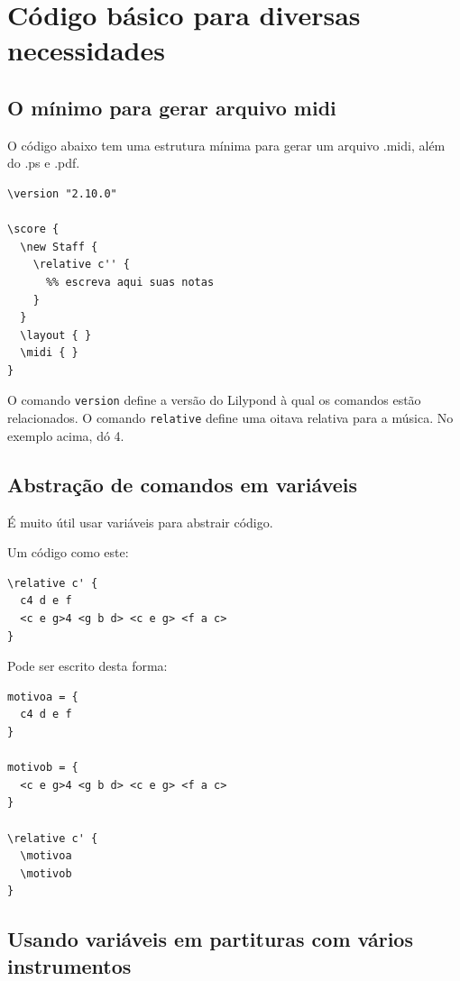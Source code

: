 \documentclass[12pt,brazil]{book}
\begin{document}
\section{Código básico para diversas necessidades}
\label{sec:codigo-basico-para}

\subsection{O mínimo para gerar arquivo midi}
\label{sec:o-minimo-para}

O código abaixo tem uma estrutura mínima para gerar um arquivo .midi,
além do .ps e .pdf.

\begin{verbatim}
\version "2.10.0"

\score {
  \new Staff {
    \relative c'' {
      %% escreva aqui suas notas
    }
  }
  \layout { }
  \midi { }
}
\end{verbatim}

O comando \texttt{version} define a versão do Lilypond à qual os
comandos estão relacionados. O comando \texttt{relative} define uma
oitava relativa para a música. No exemplo acima, dó 4.

\subsection{Abstração de comandos em variáveis}
\label{sec:abstr-de-comand}

É muito útil usar variáveis para abstrair código.

Um código como este:

\begin{verbatim}
\relative c' {
  c4 d e f
  <c e g>4 <g b d> <c e g> <f a c>
}
\end{verbatim}

Pode ser escrito desta forma:

\begin{verbatim}
motivoa = {
  c4 d e f
}

motivob = {
  <c e g>4 <g b d> <c e g> <f a c>
}

\relative c' {
  \motivoa
  \motivob
}
\end{verbatim}

\subsection{Usando variáveis em partituras com vários instrumentos}
\label{sec:usando-variaveis-em}
\end{document}
